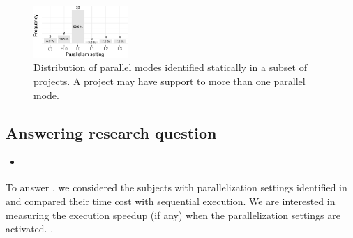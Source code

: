 \begin{figure}[h!]
    \centering
    \includegraphics[width=0.32\textwidth]{plots/barplot-modes-static.pdf}
    \caption{\label{fig:freqmodes-static}Distribution of parallel modes 
    identified statically in a subset of \numProjectsPar{} projects.
    A project may have support to more than one parallel mode.}
\end{figure}

\begin{center}
\end{center}

\subsection{Answering research question \numRQD{}}
\label{sec:rqD}

\begin{itemize}
    \item \emph{\RQD}
\end{itemize}

To answer \numRQD{}, we considered the \numProjectsPar{} subjects with
parallelization settings identified in \numRQC{} and compared their
time cost with sequential execution. We are interested in measuring the
execution speedup (if any) when the parallelization settings are
activated.
.

\begin{center}
\end{center}


